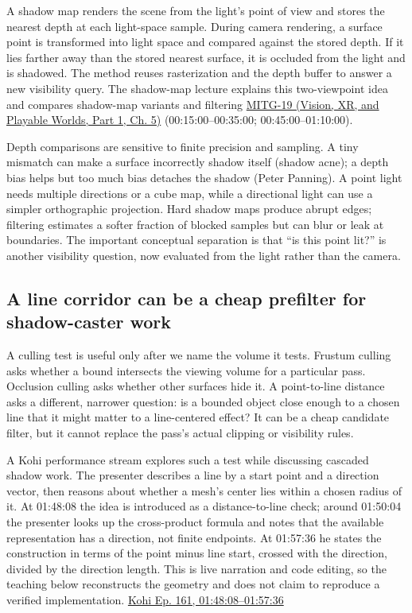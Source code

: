 A shadow map renders the scene from the light's point of view and stores the nearest depth at each light-space sample. During camera rendering, a surface point is transformed into light space and compared against the stored depth. If it lies farther away than the stored nearest surface, it is occluded from the light and is shadowed. The method reuses rasterization and the depth buffer to answer a new visibility query. The shadow-map lecture explains this two-viewpoint idea and compares shadow-map variants and filtering \href{../07-Vision-XR-and-Playable-Worlds-P01/main.pdf\#nameddest=04-visual-computing-ii-ch036-mitg-19---shadow-maps}{MITG-19 (Vision, XR, and Playable Worlds, Part 1, Ch. 5)} (00:15:00--00:35:00; 00:45:00--01:10:00).

Depth comparisons are sensitive to finite precision and sampling. A tiny mismatch can make a surface incorrectly shadow itself (shadow acne); a depth bias helps but too much bias detaches the shadow (Peter Panning). A point light needs multiple directions or a cube map, while a directional light can use a simpler orthographic projection. Hard shadow maps produce abrupt edges; filtering estimates a softer fraction of blocked samples but can blur or leak at boundaries. The important conceptual separation is that ``is this point lit?'' is another visibility question, now evaluated from the light rather than the camera.

\subsection{A line corridor can be a cheap prefilter for shadow-caster work}\label{04-visual-computing-ii-ch028-a-line-corridor-can-be-a-cheap-prefilter-for-shadow-caster-work}

\hypertarget{04-visual-computing-ii-ch028-a-line-corridor-can-be-a-cheap-prefilter-for-shadow-caster-work}{}

A culling test is useful only after we name the volume it tests. Frustum culling asks whether a bound intersects the viewing volume for a particular pass. Occlusion culling asks whether other surfaces hide it. A point-to-line distance asks a different, narrower question: is a bounded object close enough to a chosen line that it might matter to a line-centered effect? It can be a cheap candidate filter, but it cannot replace the pass's actual clipping or visibility rules.

A Kohi performance stream explores such a test while discussing cascaded shadow work. The presenter describes a line by a start point and a direction vector, then reasons about whether a mesh's center lies within a chosen radius of it. At 01:48:08 the idea is introduced as a distance-to-line check; around 01:50:04 the presenter looks up the cross-product formula and notes that the available representation has a direction, not finite endpoints. At 01:57:36 he states the construction in terms of the point minus line start, crossed with the direction, divided by the direction length. This is live narration and code editing, so the teaching below reconstructs the geometry and does not claim to reproduce a verified implementation. \href{https://www.youtube.com/watch?v=dJYWL9YAelY&t=6488s}{Kohi Ep. 161, 01:48:08--01:57:36}

